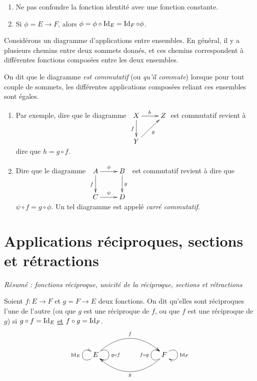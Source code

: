 \begin{remarque}
\begin{enumerate}
\item Ne pas confondre la fonction identité avec une fonction constante.
\item Si $\phi = E\to F$, alors $\phi = \phi\circ \operatorname{Id}_E = \operatorname{Id}_F\circ \phi$.
\end{enumerate}
\end{remarque}


\begin{definition}
Considérons un diagramme d'applications entre ensembles. En général, il y a plusieurs chemins entre deux sommets donnés, et ces chemins correspondent à différentes fonctions composées entre les deux ensembles.

On dit que le diagramme \emph{est commutatif} (ou \emph{qu'il commute}) lorsque pour tout couple de sommets, les différentes applications composées reliant ces ensembles sont égales.
\end{definition}

\begin{exemple}
\begin{enumerate}
\item  Par exemple, dire que le diagramme
$
\xymatrix{
X \ar[d]_{f} \ar[r]^{h}& Z \\
Y \ar[ur]_{g}& 
}
$
est commutatif revient à dire que $h = g\circ f$.
\item Dire que le diagramme 
$\xymatrix{
A \ar[r]^{\phi} \ar[d]_{f} & B \ar[d]^{g}\\
C \ar[r]^{\psi}& D 
}$
est commutatif revient à dire que $\psi\circ f = g \circ \phi$. Un tel diagramme est appelé \emph{carré commutatif}.
\end{enumerate}
\end{exemple}





\section{Applications réciproques, sections et rétractions}

\emph{Résumé : fonctions réciproque, unicité de la réciproque, sections et rétractions}


\begin{definition}
Soient $f : E\to F$ et $g = F\to E$ deux fonctions. On dit qu'elles sont réciproques l'une de l'autre (ou que $g$ est une réciproque de $f$, ou que $f$ est une réciproque de $g$) si $g\circ f = \operatorname{Id}_E$ \underline{et} $f\circ g = \operatorname{Id}_F$. 
\[
\xymatrix{
 E \ar@(dl,ul)^{\Id_E} \ar@/^2pc/[rrr]^{f} \ar@(ur,dr)^{g\circ f} 
& & & 
\ar@/^2pc/[lll]^{g} \ar@(dl,ul)^{f\circ g} F \ar@(ur,dr)^{\Id_F}
}
\]
\end{definition}



